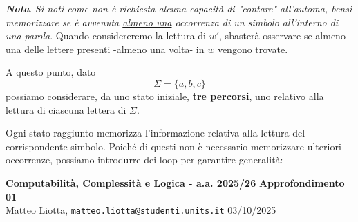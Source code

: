\documentclass[a4paper,10pt]{article}
\newcommand{\EsercitazioneNum}{01}
\newcommand{\Data}{03/10/2025}
\begin{document}
\begin{osservazioni}
    \textit{\textbf{Nota}}. \textit{Si noti come non è richiesta alcuna capacità di "contare" all'automa, bensì memorizzare se è avvenuta \underline{almeno una} occorrenza di un simbolo all'interno di una parola}. Quando considereremo la lettura di $w'$, sbasterà osservare se almeno una delle lettere presenti -almeno una volta- in $w$ vengono trovate.
\end{osservazioni}
A questo punto, dato $$\Sigma=\{a,b,c\}$$ possiamo considerare, da uno stato iniziale, \textbf{tre percorsi}, uno relativo alla lettura di ciascuna lettera di $\Sigma$. 

{
\small
\begin{center}
\end{center}
}

Ogni stato raggiunto memorizza l'informazione relativa alla lettura del corrispondente simbolo. Poiché di questi non è necessario memorizzare ulteriori occorrenze, possiamo introdurre dei loop per garantire generalità:

\vfill
    \noindent\makebox[\linewidth]{\rule{\linewidth}{0.4pt}}
    \newpage
    {\noindent
    \small \textbf{Computabilità, Complessità e Logica - a.a. 2025/26} \hfill \textbf{Approfondimento \EsercitazioneNum} \\[0.2cm]
    \scriptsize Matteo Liotta, \texttt{matteo.liotta@studenti.units.it} \hfill \Data \\[0.2cm]
    \noindent\makebox[\linewidth]{\rule{\linewidth}{0.4pt}} \\[0.3cm]}

{
\small
\begin{center}
\end{center}
}
\end{document}
